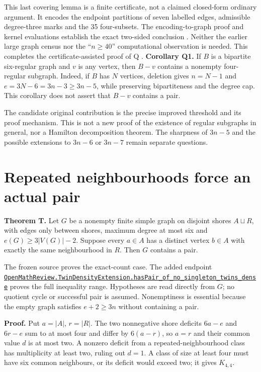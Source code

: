 \documentclass[smallextended]{svjour3}
\newcounter{none} %
\begin{document}
This last covering lemma is a finite certificate, not a claimed
closed-form ordinary argument. It encodes the endpoint partitions of
seven labelled edges, admissible degree-three marks and the 35
four-subsets. The encoding-to-graph proof and kernel evaluations
establish the exact two-sided conclusion \cite{ref11}. Neither the earlier
large graph census nor the ``\(n\ge40\)'' computational observation is
needed. This completes the certificate-assisted proof of Q \cite{ref11}.
\textbf{Corollary Q1.} If \(B\) is a bipartite six-regular graph and
\(v\) is any vertex, then \(B-v\) contains a nonempty four-regular
subgraph. Indeed, if \(B\) has \(N\) vertices, deletion gives \(n=N-1\)
and \(e=3N-6=3n-3\geq3n-5\), while preserving bipartiteness and the
degree cap. This corollary does not assert that \(B-v\) contains a pair.

The candidate original contribution is the precise improved threshold
and its proof mechanism. This is not a new proof of the existence of
regular subgraphs in general, nor a Hamilton decomposition theorem. The
sharpness of \(3n-5\) and the possible extensions to \(3n-6\) or
\(3n-7\) remain separate questions.

\section{Repeated neighbourhoods force an actual
pair}\label{repeated-neighbourhoods-force-an-actual-pair}

\textbf{Theorem T.} Let \(G\) be a nonempty finite simple graph on
disjoint shores \(A\sqcup R\), with edges only between shores, maximum
degree at most six and \(e(G)\geq3|V(G)|-2\). Suppose every \(a\in A\)
has a distinct vertex \(b\in A\) with exactly the same neighbourhood in
\(R\). Then \(G\) contains a pair.

The frozen source proves the exact-count case. The added endpoint
\href{https://github.com/alejandrozu/openmath-2026-judging/blob/70c5ec3107658182f22c207d4c50f53f9cb3e602/robert-review-2026-10-07/lean/TwinDensityExtension.lean\#L132}{{\ttfamily\nolinkurl{OpenMathReview.TwinDensityExtension.hasPair_of_no_singleton_twins_dense}}}
proves the full inequality range. Hypotheses are read directly from
\(G\); no quotient cycle or successful pair is assumed. Nonemptiness is
essential because the empty graph satisfies \(e+2\geq3n\) without
containing a pair.

\textbf{Proof.} Put \(a=|A|\), \(r=|R|\). The two nonnegative shore
deficits \(6a-e\) and \(6r-e\) sum to at most four and differ by
\(6(a-r)\), so \(a=r\) and their common value \(d\) is at most two. A
nonzero deficit from a repeated-neighbourhood class has multiplicity at
least two, ruling out \(d=1\). A class of size at least four must have
six common neighbours, or its deficit would exceed two; it gives
\(K_{4,4}\).
\end{document}
